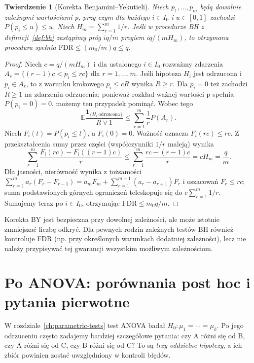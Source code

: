 \documentclass[11pt,a4paper,oneside]{report}
\numberwithin{equation}{chapter}
\theoremstyle{plain}
\newtheorem{twierdzenie}{Twierdzenie}[chapter]
\theoremstyle{definition}
\theoremstyle{remark}
\newcommand{\E}{\mathbb E}
\newcommand{\ind}[1]{\mathbf 1_{#1}}
\begin{document}
\begin{twierdzenie}[Korekta Benjamini--Yekutieli]\label{thm:by}
Niech $p_1,\ldots,p_m$ będą dowolnie zależnymi
wartościami p, przy czym dla każdego $i\in I_0$
i $u\in[0,1]$ zachodzi $P(p_i\le u)\le u$.
Niech $H_m=\sum_{r=1}^m1/r$. Jeśli w procedurze BH
z definicji~\ref{def:bh} zastąpimy próg $iq/m$ progiem
$iq/(mH_m)$, to otrzymana procedura spełnia
$\mathrm{FDR}\le(m_0/m)q\le q$.
\end{twierdzenie}
\begin{proof}
Niech $c=q/(mH_m)$ i dla ustalonego $i\in I_0$
rozważmy zdarzenia $A_r=\{(r-1)c<p_i\le rc\}$
dla $r=1,\ldots,m$. Jeśli hipoteza $H_i$ jest
odrzucona i $p_i\in A_r$, to z warunku krokowego
$p_i\le cR$ wynika $R\ge r$. Dla $p_i=0$
też zachodzi $R\ge1$ na zdarzeniu odrzucenia;
ponieważ rozkład ważnej wartości p spełnia
$P(p_i=0)=0$, możemy ten przypadek pominąć.
Wobec tego
\[
 \E\frac{\ind{\{H_i\ \text{odrzucona}\}}}{R\vee1}
 \le\sum_{r=1}^m\frac1rP(A_r).
\]
Niech $F_i(t)=P(p_i\le t)$, a $F_i(0)=0$.
Ważność oznacza $F_i(rc)\le rc$. Z przekształcenia
sumy przez części (współczynniki $1/r$ maleją) wynika
\[
 \sum_{r=1}^m\frac{F_i(rc)-F_i((r-1)c)}r
 \le\sum_{r=1}^m\frac{rc-(r-1)c}{r}
 =cH_m=\frac qm.
\]
Dla jasności, nierówność wynika z tożsamości
$\sum_{r=1}^m a_r(F_r-F_{r-1})=
 a_mF_m+\sum_{r=1}^{m-1}(a_r-a_{r+1})F_r$
i oszacowań $F_r\le rc$; suma podstawionych górnych
ograniczeń teleskopuje się do $c\sum_{r=1}^m1/r$.
Sumujemy teraz po $i\in I_0$, otrzymując
$\mathrm{FDR}\le m_0q/m$.
\end{proof}

Korekta BY jest bezpieczna przy dowolnej zależności,
ale może istotnie zmniejszać liczbę odkryć. Dla pewnych
rodzin zależnych testów BH również kontroluje FDR
(np. przy określonych warunkach dodatniej zależności),
lecz nie należy przypisywać tej gwarancji wszystkim
możliwym zależnościom.

\section{Po ANOVA: porównania post hoc i pytania pierwotne}
W rozdziale~\ref{ch:parametric-tests} test ANOVA badał
$H_0:\mu_1=\cdots=\mu_k$. Po jego odrzuceniu często
zadajemy bardziej szczegółowe pytania: czy A różni się od B,
czy A różni się od C, czy B różni się od C? To są
\emph{trzy oddzielne hipotezy}, a ich zbiór powinien zostać
uwzględniony w kontroli błędów.
\end{document}
